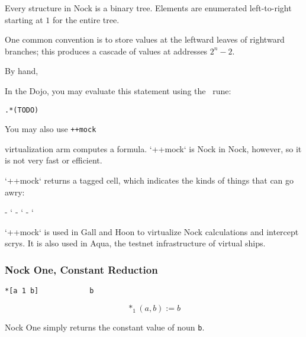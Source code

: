 Every structure in Nock is a binary tree.  Elements are enumerated left-to-right starting at $1$ for the entire tree.


One common convention is to store values at the leftward leaves of rightward branches; this produces a cascade of values at addresses $2^{n}-2$.





By hand,



In the Dojo, you may evaluate this statement using the \pdottar~rune:

\begin{lstlisting}[style=nonumbers]
.*(TODO)
\end{lstlisting}

You may also use \texttt{++mock}

virtualization arm computes a formula.  `++mock` is Nock in Nock, however, so it is not very fast or efficient.

`++mock` returns a tagged cell, which indicates the kinds of things that can go awry:

- `%
- `%
- `%

`++mock` is used in Gall and Hoon to virtualize Nock calculations and intercept scrys.  It is also used in Aqua, the testnet infrastructure of virtual ships.

\subsubsection[Nock One]{Nock One, Constant Reduction}

\begin{lstlisting}[style=nonumbers]
*[a 1 b]            b
\end{lstlisting}

$$
*_{1}(a,b) := b
$$

Nock One simply returns the constant value of noun \texttt{b}.

